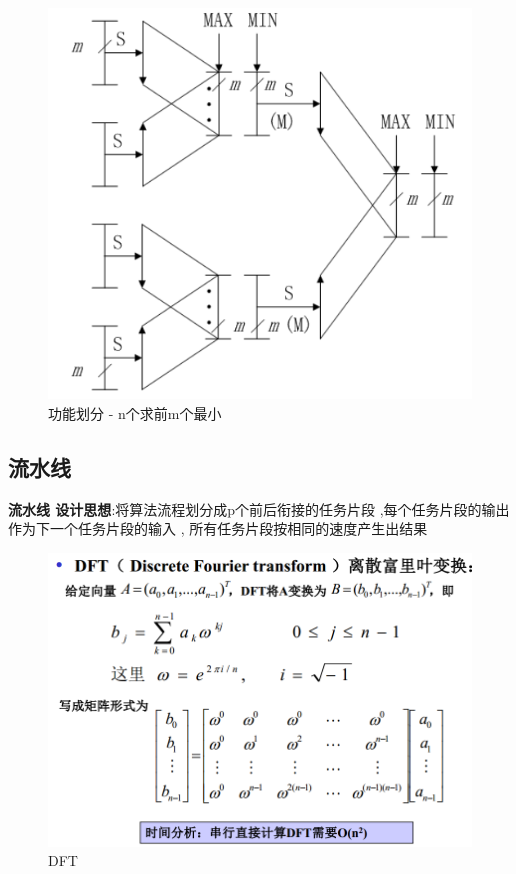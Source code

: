 \documentclass[UTF8,a4paper]{ctexart}
\begin{document}
  \begin{figure}[H]
    \centering
    \includegraphics[scale = 0.3]{assets/ParallelComputing_a7ba0.png}
    \caption{功能划分 - n个求前m个最小}
  \end{figure}


  \subsection{流水线}
  \textbf{流水线 设计思想}:将算法流程划分成p个前后衔接的任务片段 ,每个任务片段的输出作为下一个任务片段的输入 , 所有任务片段按相同的速度产生出结果

  \begin{figure}[H]
    \centering
    \includegraphics[scale = 0.3]{assets/ParallelComputing_a5d0f.png}
    \caption{DFT}
  \end{figure}
\end{document}
